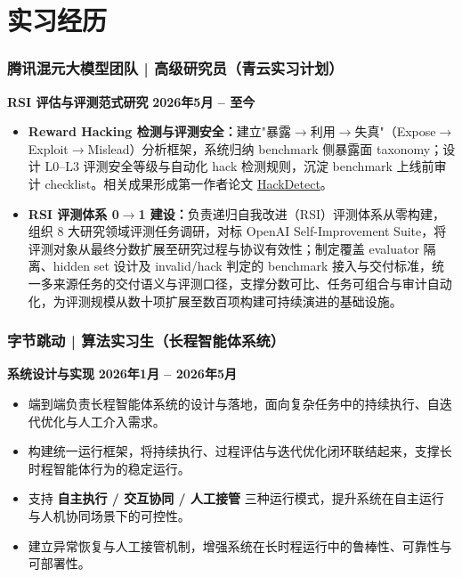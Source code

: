 \documentclass[10pt,a4paper]{article}
\begin{document}
\section*{\color{sectioncolor}实习经历}
\subsubsection*{\color{itemcolor}腾讯混元大模型团队 | 高级研究员（青云实习计划）}
\noindent\textbf{\color{sectioncolor}RSI 评估与评测范式研究} \hfill \color{accentcolor}\textbf{2026年5月 -- 至今}
\begin{itemize}[leftmargin=*]
    \item \textbf{Reward Hacking 检测与评测安全：}建立"暴露$\rightarrow$利用$\rightarrow$失真"（Expose$\rightarrow$Exploit$\rightarrow$Mislead）分析框架，系统归纳 benchmark 侧暴露面 taxonomy；设计 L0--L3 评测安全等级与自动化 hack 检测规则，沉淀 benchmark 上线前审计 checklist。相关成果形成第一作者论文 \href{https://arxiv.org/abs/2607.22368}{\color{linkcolor}HackDetect}。
    \item \textbf{RSI 评测体系 0$\rightarrow$1 建设：}负责递归自我改进（RSI）评测体系从零构建，组织 8 大研究领域评测任务调研，对标 OpenAI Self-Improvement Suite，将评测对象从最终分数扩展至研究过程与协议有效性；制定覆盖 evaluator 隔离、hidden set 设计及 invalid/hack 判定的 benchmark 接入与交付标准，统一多来源任务的交付语义与评测口径，支撑分数可比、任务可组合与审计自动化，为评测规模从数十项扩展至数百项构建可持续演进的基础设施。
\end{itemize}

\subsubsection*{\color{itemcolor}字节跳动 | 算法实习生（长程智能体系统）}
\noindent\textbf{\color{sectioncolor}系统设计与实现} \hfill \color{accentcolor}\textbf{2026年1月 -- 2026年5月}
\begin{itemize}[leftmargin=*]
    \item 端到端负责长程智能体系统的设计与落地，面向复杂任务中的持续执行、自迭代优化与人工介入需求。
    \item 构建统一运行框架，将持续执行、过程评估与迭代优化闭环联结起来，支撑长时程智能体行为的稳定运行。
    \item 支持 \textbf{自主执行 / 交互协同 / 人工接管} 三种运行模式，提升系统在自主运行与人机协同场景下的可控性。
    \item 建立异常恢复与人工接管机制，增强系统在长时程运行中的鲁棒性、可靠性与可部署性。
\end{itemize}
\end{document}
